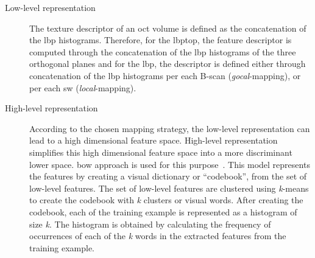 \begin{description}

\item[Low-level representation] The texture descriptor of an \ac{oct} volume is defined as the concatenation of the \ac{lbp} histograms.
Therefore, for the \ac{lbptop}, the feature descriptor is computed through the concatenation of the \ac{lbp} histograms of the three orthogonal planes and for the \ac{lbp}, the descriptor is defined either through concatenation of the \ac{lbp} histograms per each B-scan (\emph{gocal}-mapping), or per each \ac{sw} (\emph{local}-mapping).

\item[High-level representation] According to the chosen mapping strategy, the low-level representation can lead to a high dimensional feature space. 
High-level representation simplifies this high dimensional feature space into a more discriminant lower space. 
\ac{bow} approach is used for this purpose~\cite{Sivic2003}.
This model represents the features by creating a visual dictionary or ``codebook'', from the set of low-level features.
The set of low-level features are clustered using \textit{k}-means to create the codebook with \textit{k} clusters or visual words.
After creating the codebook, each of the training example is represented as a histogram of size \textit{k}. 
The histogram is obtained by calculating the frequency of occurrences of each of the \textit{k} words in the extracted features from the training example. 

\end{description}


